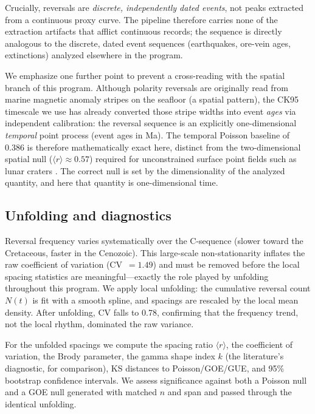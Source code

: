 \documentclass[12pt,a4paper]{article}
\begin{document}
Crucially, reversals are \emph{discrete, independently dated events}, not peaks extracted from a continuous proxy curve. The pipeline therefore carries none of the extraction artifacts that afflict continuous records; the sequence is directly analogous to the discrete, dated event sequences (earthquakes, ore-vein ages, extinctions) analyzed elsewhere in the program.

We emphasize one further point to prevent a cross-reading with the spatial branch of this program. Although polarity reversals are originally read from marine magnetic anomaly stripes on the seafloor (a spatial pattern), the CK95 timescale we use has already converted those stripe widths into event \emph{ages} via independent calibration: the reversal sequence is an explicitly one-dimensional \emph{temporal} point process (event ages in Ma). The temporal Poisson baseline of $0.386$ is therefore mathematically exact here, distinct from the two-dimensional spatial null ($\langle r\rangle\approx0.57$) required for unconstrained surface point fields such as lunar craters \citep{chen2026lunar}. The correct null is set by the dimensionality of the analyzed quantity, and here that quantity is one-dimensional time.

\subsection{Unfolding and diagnostics}

Reversal frequency varies systematically over the C-sequence (slower toward the Cretaceous, faster in the Cenozoic). This large-scale non-stationarity inflates the raw coefficient of variation (CV~$=1.49$) and must be removed before the local spacing statistics are meaningful---exactly the role played by unfolding throughout this program. We apply local unfolding: the cumulative reversal count $N(t)$ is fit with a smooth spline, and spacings are rescaled by the local mean density. After unfolding, CV falls to 0.78, confirming that the frequency trend, not the local rhythm, dominated the raw variance.

For the unfolded spacings we compute the spacing ratio $\langle r\rangle$, the coefficient of variation, the Brody parameter, the gamma shape index $k$ (the literature's diagnostic, for comparison), KS distances to Poisson/GOE/GUE, and 95\% bootstrap confidence intervals. We assess significance against both a Poisson null and a GOE null generated with matched $n$ and span and passed through the identical unfolding.
\end{document}
